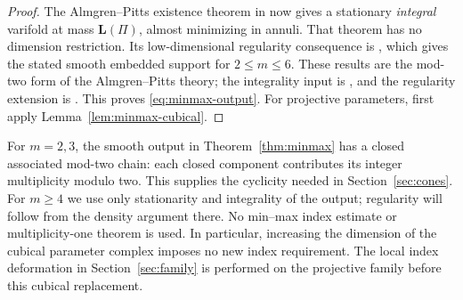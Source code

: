 \begin{proof}
The Almgren--Pitts existence theorem in
\cite[Theorem~2.14, p.~10]{MarquesNeves2017} now gives a stationary
\emph{integral} varifold at mass $\mathbf L(\Pi)$, almost minimizing
in annuli. That theorem has no dimension restriction. Its
low-dimensional regularity consequence is
\cite[Theorem~2.11, pp.~8--9]{MarquesNeves2017}, which gives the
stated smooth embedded support for $2\le m\le6$. These results
are the mod-two form of the Almgren--Pitts theory; the integrality
input is \cite[Theorem~3.13]{Pitts1981}, and the regularity
extension is \cite[Theorem~4]{SchoenSimon1981}. This proves
\eqref{eq:minmax-output}. For projective parameters, first apply
Lemma~\ref{lem:minmax-cubical}.
\end{proof}

\begin{remark}\label{rem:minmax-scope}
For $m=2,3$, the smooth output in Theorem~\ref{thm:minmax} has a
closed associated mod-two chain: each closed component contributes
its integer multiplicity modulo two. This supplies the cyclicity
needed in Section~\ref{sec:cones}. For $m\ge4$ we use only
stationarity and integrality of the output; regularity will follow
from the density argument there. No min--max index estimate or
multiplicity-one theorem is used. In particular, increasing the
dimension of the cubical parameter complex imposes no new index
requirement. The local index deformation in
Section~\ref{sec:family} is performed on the projective family
before this cubical replacement.
\end{remark}

